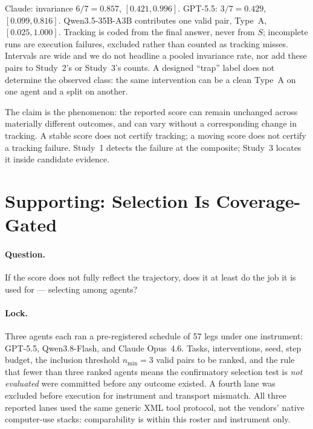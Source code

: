\documentclass[sigconf,anonymous]{aamas}
\begin{document}
Claude: invariance $6/7=0.857$, $[0.421,0.996]$.
GPT-5.5: $3/7=0.429$, $[0.099,0.816]$.
Qwen3.5-35B-A3B contributes one valid pair, Type~A, $[0.025,1.000]$.
Tracking is coded from the final answer, never from $S$; incomplete runs are execution failures, excluded rather than counted as tracking misses.
Intervals are wide and we do not headline a pooled invariance rate, nor add these pairs to Study~2's or Study~3's counts.
A designed ``trap'' label does not determine the observed class: the same intervention can be a clean Type~A on one agent and a split on another.

The claim is the phenomenon: the reported score can remain unchanged across materially different outcomes, and can vary without a corresponding change in tracking.
A stable score does not certify tracking; a moving score does not certify a tracking failure.
Study~1 detects the failure at the composite; Study~3 locates it inside candidate evidence.

\section{Supporting: Selection Is Coverage-Gated}
\label{sec:s2}

\paragraph{Question.}
If the score does not fully reflect the trajectory, does it at least do the job it is used for --- selecting among agents?

\paragraph{Lock.}
Three agents each ran a pre-registered schedule of 57 legs under one instrument: GPT-5.5, Qwen3.8-Flash, and Claude Opus~4.6.
Tasks, interventions, seed, step budget, the inclusion threshold $n_{\min}=3$ valid pairs to be ranked, and the rule that fewer than three ranked agents means the confirmatory selection test is \emph{not evaluated} were committed before any outcome existed.
A fourth lane was excluded before execution for instrument and transport mismatch.
All three reported lanes used the same generic XML tool protocol, not the vendors' native computer-use stacks: comparability is within this roster and instrument only.
\end{document}
